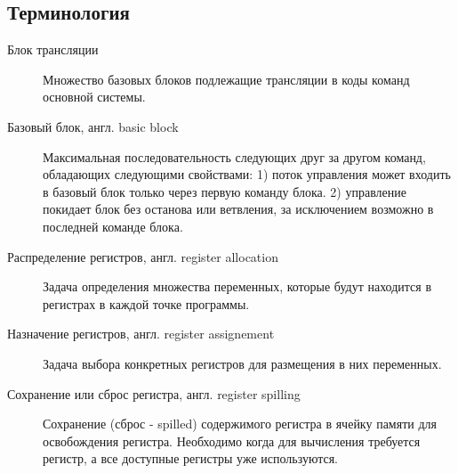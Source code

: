 \subsection{Терминология}
\begin{description}

\item[Блок трансляции]
Множество базовых блоков подлежащие трансляции в коды команд основной системы.

\item[Базовый блок, англ. basic block]

Максимальная последовательность следующих друг за другом команд, обладающих следующими свойствами: 1) поток управления может входить в базовый блок только через первую команду блока. 2) управление покидает блок без останова или ветвления, за исключением возможно в последней команде блока.

\item[Распределение регистров, англ. register allocation]

Задача определения множества переменных, которые будут находится в регистрах в каждой точке программы.

\item[Назначение регистров, англ. register assignement]

Задача выбора конкретных регистров для размещения в них переменных.

\item[Сохранение или сброс регистра, англ. register spilling]

Сохранение (сброс - spilled) содержимого регистра в ячейку памяти для освобождения регистра. Необходимо
когда для вычисления требуется регистр, а все доступные регистры уже используются.


\end{description}

